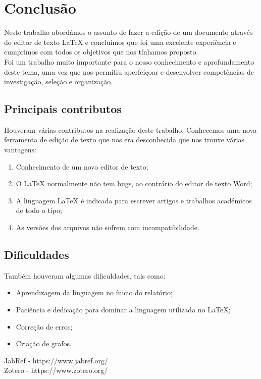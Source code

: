 \documentclass[a4wide]{report}
\begin{document}
\chapter{Conclusão}
Neste trabalho abordámos o assunto de fazer a edição de um documento através do editor de texto LaTeX e concluímos que foi uma excelente experiência e cumprimos com todos os objetivos que nos tínhamos proposto.\\
Foi um trabalho muito importante para o nosso conhecimento e aprofundamento deste tema, uma vez que nos permitiu aperfeiçoar e desenvolver competências de investigação, seleção e organização. 
\label{cap:conclusao}
\section{Principais contributos}
Houveram várias contributos na realização deste trabalho. Conhecemos uma nova ferramenta de edição de texto que nos era desconhecida que nos trouxe várias vantagens:
\begin{enumerate}
    \item Conhecimento de um novo editor de texto;
    \item O LaTeX normalmente não tem bugs, ao contrário do editor de texto Word;
    \item A linguagem LaTeX é indicada para escrever artigos e trabalhos académicos de todo o tipo;
    \item As versões dos arquivos não sofrem com incompatibilidade.
\end{enumerate}
\section{Dificuldades}
Também houveram algumas dificuldades, tais como:
\begin{itemize}
    \item Aprendizagem da linguagem no ínicio do relatório;
    \item Paciência e dedicação para dominar a linguagem utilizada no LaTeX;
    \item Correção de erros;
    \item Criação de grafos.
\end{itemize}



 JabRef - https://www.jabref.org/\\Zotero - https://www.zotero.org/
\end{document}
